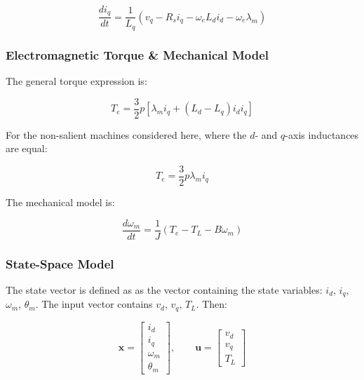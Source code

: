 \documentclass{article}
\begin{document}
\begin{equation}
    \boxed{
    \frac{di_q}{dt} = \frac{1}{L_q}(v_q - R_si_q - \omega_eL_di_d - \omega_e\lambda_m)
    }
\end{equation}

\subsubsection{Electromagnetic Torque \& Mechanical Model}

The general torque expression is:

\begin{equation}
    T_e = \frac{3}{2}p[\lambda_mi_q + (L_d - L_q)i_di_q]
\end{equation}

For the non-salient machines considered here, where the $d$- and $q$-axis inductances are equal:

\begin{equation}
    \boxed{
    T_e = \frac{3}{2}p\lambda_mi_q
    }
\end{equation}

The mechanical model is:

\begin{equation}
    \frac{d\omega_m}{dt} = \frac{1}{J}(T_e - T_L - B\omega_m)
\end{equation}


\subsubsection{State-Space Model}

The state vector is defined as as the vector containing the state variables: $i_d$, $i_q$, $\omega_m$, $\theta_m$. The input vector contains $v_d$, $v_q$, $T_L$. Then:

\begin{equation}
    \mathbf{x} =
    \begin{bmatrix}
        i_d \\
        i_q \\
        \omega_m \\
        \theta_m
    \end{bmatrix},
    \qquad
    \mathbf{u} =
    \begin{bmatrix}
        v_d \\
        v_q \\
        T_L
    \end{bmatrix}
\end{equation}
\end{document}

